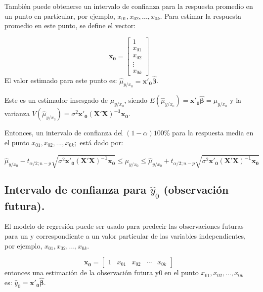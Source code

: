 \documentclass[
]{book}
\begin{document}
También puede obtenerse un intervalo de confianza para la respuesta promedio en un punto en particular, por ejemplo, \(x_{01},x_{02},...,x_{0k}\). Para estimar la respuesta promedio en este punto, se define el vector:

\[
\begin{equation}
\boldsymbol{x_{0}}=\begin{bmatrix}
1\\ 
x_{01}\\ 
x_{02}\\ 
\vdots \\ 
x_{0k}
\end{bmatrix}
\end{equation}
\] El valor estimado para este punto es: \(\hat{\mu}_{y/x_{0}}=\boldsymbol{x'_{0}\hat{\beta}}\).

Este es un estimador insesgado de \(\mu_{y/x_{0}}\), siendo \(E(\hat{\mu}_{y/x_{0}})=\boldsymbol{x'_{0}\hat{\beta}}=\mu_{y/x_{0}}\) y la varianza \(V(\hat{\mu}_{y/x_{0}})=\sigma^{2}\boldsymbol{x'_{0}(X'X)^{-1}x_{0}}.\)

Entonces, un intervalo de confianza del \((1-\alpha)100\)\% para la respuesta media en el punto \(x_{01},x_{02},...,x_{0k};\) está dado por:

\[
\begin{equation}
\hat{\mu}_{y/x_{0}}-t_{\alpha/2;n-p}\sqrt{\sigma^{2}\boldsymbol{x'_{0}(X'X)^{-1}x_{0}}}\leq\mu_{y/x_{0}}\leq\hat{\mu}_{y/x_{0}}+t_{\alpha/2;n-p}\sqrt{\sigma^{2}\boldsymbol{x'_{0}(X'X)^{-1}x_{0}}}
\end{equation}
\]

\hypertarget{intervalo-de-confianza-para-haty_0-observaciuxf3n-futura.}{%
\subsection{\texorpdfstring{Intervalo de confianza para \(\hat{y}_{0}\) (observación futura).}{Intervalo de confianza para \textbackslash hat\{y\}\_\{0\} (observación futura).}}\label{intervalo-de-confianza-para-haty_0-observaciuxf3n-futura.}}

El modelo de regresión puede ser usado para predecir las observaciones futuras para un y correspondiente a un valor particular de las variables independientes, por ejemplo, \(x_{01},x_{02},...,x_{0k}.\)

\[
\boldsymbol{x_{0}}=\begin{bmatrix}
 1&  x_{01}&  x_{02}&  \cdots& x_{0k} 
\end{bmatrix}
\] entonces una estimación de la observación futura y0 en el punto \(x_{01},x_{02},...,x_{0k}\) es: \(\hat{y}_{0}=\boldsymbol{x'_{0}\hat{\beta}}.\)
\end{document}
